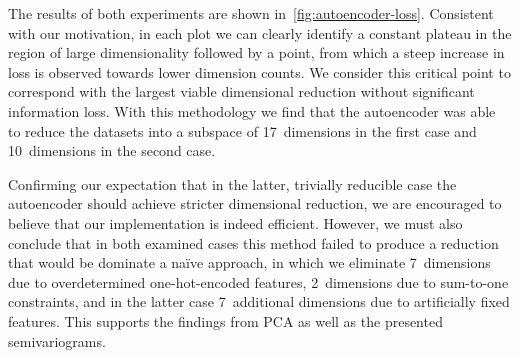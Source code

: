 The results of both experiments are shown in~\cref{fig:autoencoder-loss}.
Consistent with our motivation, in each plot we can clearly identify a constant
plateau in the region of large dimensionality followed by a point, from which a
steep increase in loss is observed towards lower dimension counts. We consider
this critical point to correspond with the largest viable dimensional reduction
without significant information loss.
With this methodology we find that the autoencoder was able to reduce the
datasets into a subspace of 17~dimensions in the first case and 10~dimensions in
the second case.

Confirming our expectation that in the latter, trivially reducible case the
autoencoder should achieve stricter dimensional reduction, we are
encouraged to believe that our implementation is indeed efficient. However, we
must also conclude that in both examined cases this method failed to produce a
reduction that would be dominate a naïve approach, in which we eliminate
7~dimensions due to overdetermined one-hot-encoded features, 2~dimensions due to
sum-to-one constraints, and in the latter case 7~additional dimensions due to
artificially fixed features. This supports the findings from PCA as well as the
presented semivariograms.



